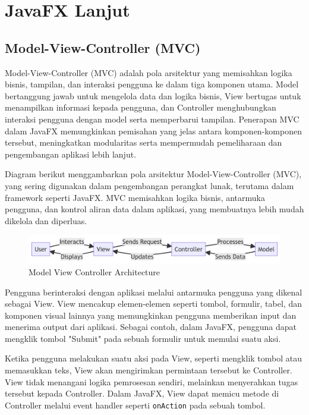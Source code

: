 \chapter{JavaFX Lanjut}

\section{Model-View-Controller (MVC)}

Model-View-Controller (MVC) adalah pola arsitektur yang memisahkan logika bisnis, tampilan, dan interaksi pengguna ke dalam tiga komponen utama. Model bertanggung jawab untuk mengelola data dan logika bisnis, View bertugas untuk menampilkan informasi kepada pengguna, dan Controller menghubungkan interaksi pengguna dengan model serta memperbarui tampilan. Penerapan MVC dalam JavaFX memungkinkan pemisahan yang jelas antara komponen-komponen tersebut, meningkatkan modularitas serta mempermudah pemeliharaan dan pengembangan aplikasi lebih lanjut.

Diagram berikut menggambarkan pola arsitektur Model-View-Controller (MVC), yang sering digunakan dalam pengembangan perangkat lunak, terutama dalam framework seperti JavaFX. MVC memisahkan logika bisnis, antarmuka pengguna, dan kontrol aliran data dalam aplikasi, yang membuatnya lebih mudah dikelola dan diperluas.

\begin{figure}[ht]
	\centering
	\includegraphics[width=\textwidth]{../figures/mvc-modern.png}
	\caption{Model View Controller Architecture}
	\label{fig:mvc_architecture}
\end{figure}

Pengguna berinteraksi dengan aplikasi melalui antarmuka pengguna yang dikenal sebagai View. View mencakup elemen-elemen seperti tombol, formulir, tabel, dan komponen visual lainnya yang memungkinkan pengguna memberikan input dan menerima output dari aplikasi. Sebagai contoh, dalam JavaFX, pengguna dapat mengklik tombol "Submit" pada sebuah formulir untuk memulai suatu aksi.

Ketika pengguna melakukan suatu aksi pada View, seperti mengklik tombol atau memasukkan teks, View akan mengirimkan permintaan tersebut ke Controller. View tidak menangani logika pemrosesan sendiri, melainkan menyerahkan tugas tersebut kepada Controller. Dalam JavaFX, View dapat memicu metode di Controller melalui event handler seperti \texttt{onAction} pada sebuah tombol.

